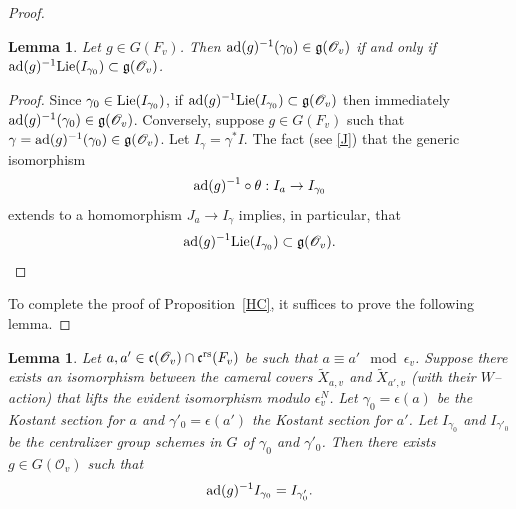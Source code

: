 \documentclass[12pt,english]{smfart}
\numberwithin{equation}{subsection}
\newtheorem{lemma}[equation]{Lemma}
\theoremstyle{remark}
\newcommand\calO{{\mathscr O}}
\newcommand\frakg{{\mathfrak g}}
\newcommand\frakc{{\mathfrak c}}
\newcommand\ad{{\rm ad}}
\newcommand\rs{{\rm rs}}
\begin{document}
\begin{proof}
\begin{lemma}
Let $g\in G(F_v)$. Then $\ad(g)^{-1}(\gamma_0)\in \frakg(\calO_v)$ if and only if $\ad(g)^{-1} {\rm Lie}(I_{\gamma_0}) \subset \frakg(\calO_v)$.
\end{lemma}

\begin{proof}
Since $\gamma_0\in {\rm Lie}(I_{\gamma_0})$, if $\ad(g)^{-1} {\rm Lie}(I_{\gamma_0})\subset \frakg(\calO_v)$ then immediately $\ad(g)^{-1}(\gamma_0)\in \frakg(\calO_v)$. Conversely, suppose $g\in G(F_v)$ such that $\gamma=\ad(g)^{-1}(\gamma_0) \in \frakg(\calO_v)$. Let $I_\gamma=\gamma^*I$. The fact (see \ref{J}) that the generic isomorphism
$$\ad(g)^{-1}\circ\theta : I_a \to I_{\gamma_0}$$
extends to a homomorphism $J_a\to I_\gamma$ implies, in particular, that
$$\ad(g)^{-1} {\rm Lie}(I_{\gamma_0})\subset \frakg(\calO_v).
$$
\end{proof}

To complete the proof of Proposition~\ref{HC}, it suffices to prove the following lemma.
\end{proof}

\begin{lemma}
Let $a,a'\in \frakc(\calO_v)\cap \frakc^\rs(F_v)$ be such that $a\equiv a'
\mod \epsilon_v$. Suppose there exists an isomorphism between the cameral covers $\widetilde X_{a,v}$ and $\widetilde X_{a',v}$ (with their $W$--action) that lifts the evident isomorphism modulo $\epsilon_v^N$. Let $\gamma_0=\epsilon(a)$ be the Kostant section for $a$ and $\gamma'_0=\epsilon(a')$ the Kostant section for $a'$. Let $I_{\gamma_0}$ and $I_{\gamma'_0}$ be the centralizer group schemes in $G$ of $\gamma_0$ and $\gamma'_0$. Then there exists $g\in G(\calO_v)$ such that
$$
\ad(g)^{-1}I_{\gamma_0}= I_{\gamma'_0}.
$$
\end{lemma}
\end{document}
